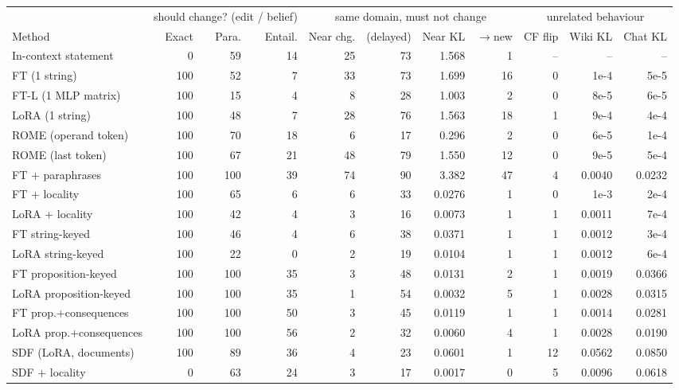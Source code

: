 \begin{tabular}{lrrrrrrrrrr}
\toprule
 & \multicolumn{3}{c}{should change? (edit / belief)} & \multicolumn{4}{c}{same domain, must not change} & \multicolumn{3}{c}{unrelated behaviour} \\
\cmidrule(lr){2-4}\cmidrule(lr){5-8}\cmidrule(lr){9-11}
Method & Exact & Para. & Entail. & Near chg. & (delayed) & Near KL & $\to$new & CF flip & Wiki KL & Chat KL \\
\midrule
In-context statement & 0 & 59 & 14 & 25 & 73 & 1.568 & 1 & -- & -- & -- \\
\addlinespace[2pt]
FT (1 string) & 100 & 52 & 7 & 33 & 73 & 1.699 & 16 & 0 & 1e-4 & 5e-5 \\
FT-L (1 MLP matrix) & 100 & 15 & 4 & 8 & 28 & 1.003 & 2 & 0 & 8e-5 & 6e-5 \\
LoRA (1 string) & 100 & 48 & 7 & 28 & 76 & 1.563 & 18 & 1 & 9e-4 & 4e-4 \\
ROME (operand token) & 100 & 70 & 18 & 6 & 17 & 0.296 & 2 & 0 & 6e-5 & 1e-4 \\
ROME (last token) & 100 & 67 & 21 & 48 & 79 & 1.550 & 12 & 0 & 9e-5 & 5e-4 \\
FT + paraphrases & 100 & 100 & 39 & 74 & 90 & 3.382 & 47 & 4 & 0.0040 & 0.0232 \\
\addlinespace[2pt]
FT + locality & 100 & 65 & 6 & 6 & 33 & 0.0276 & 1 & 0 & 1e-3 & 2e-4 \\
LoRA + locality & 100 & 42 & 4 & 3 & 16 & 0.0073 & 1 & 1 & 0.0011 & 7e-4 \\
\addlinespace[2pt]
FT string-keyed & 100 & 46 & 4 & 6 & 38 & 0.0371 & 1 & 1 & 0.0012 & 3e-4 \\
LoRA string-keyed & 100 & 22 & 0 & 2 & 19 & 0.0104 & 1 & 1 & 0.0012 & 6e-4 \\
\addlinespace[2pt]
FT proposition-keyed & 100 & 100 & 35 & 3 & 48 & 0.0131 & 2 & 1 & 0.0019 & 0.0366 \\
LoRA proposition-keyed & 100 & 100 & 35 & 1 & 54 & 0.0032 & 5 & 1 & 0.0028 & 0.0315 \\
\addlinespace[2pt]
FT prop.+consequences & 100 & 100 & 50 & 3 & 45 & 0.0119 & 1 & 1 & 0.0014 & 0.0281 \\
LoRA prop.+consequences & 100 & 100 & 56 & 2 & 32 & 0.0060 & 4 & 1 & 0.0028 & 0.0190 \\
\addlinespace[2pt]
SDF (LoRA, documents) & 100 & 89 & 36 & 4 & 23 & 0.0601 & 1 & 12 & 0.0562 & 0.0850 \\
SDF + locality & 0 & 63 & 24 & 3 & 17 & 0.0017 & 0 & 5 & 0.0096 & 0.0618 \\
\bottomrule
\end{tabular}
